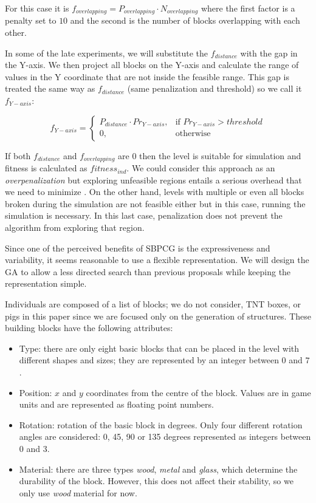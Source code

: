 \documentclass[a4paper,twoside]{article}
\begin{document}
For this case it is $f_{overlapping} = P_{overlapping} \cdot N_{overlapping}$ where the first factor is a penalty set to $10$ and the second is the number of  blocks overlapping with each other. 

In some of the late experiments, we will substitute the $f_{distance}$ with the gap in the Y-axis.  We then project all blocks on the Y-axis and calculate the range of values in the Y coordinate that are not inside the feasible range. This gap is treated the same way as $f_{distance}$
(same penalization and threshold) so we call it $f_{Y-axis}$:

$$f_{Y-axis} = 
\begin{cases}
P_{distance}\cdot Pr_{Y-axis}, & \text{if } Pr_{Y-axis} > threshold\\
0, & \text{otherwise}
\end{cases}
$$

If both $f_{distance}$ and $f_{overlapping}$ are $0$ then the level is suitable for simulation and fitness is calculated as $fitness_{ind}$. We  could consider this approach as an \textit{overpenalization} but exploring unfeasible regions entails a serious overhead that we need to minimize \cite{runarsson2003evolutionary}. On the other hand, levels with multiple or even all blocks broken during the simulation are not feasible either but in this case, running the simulation is necessary. In this last case, penalization does not prevent the algorithm from exploring that region.

Since one of the perceived benefits of SBPCG is the expressiveness and variability, it seems reasonable to use a flexible representation. We will design the GA to allow a less directed search than previous proposals while keeping the representation simple.

Individuals are composed of a list of blocks; we do not consider, TNT boxes, or pigs in this paper since we are focused only on the generation of structures. These building blocks have the following attributes:

\begin{itemize}
	\item Type: there are only eight basic blocks that can be placed in the level 
	with different shapes and sizes; they are represented by an 
        integer between $0$ and $7$.
	\item Position: $x$ and $y$  coordinates from the centre of the block. Values are in game 
	units and are represented as floating point numbers.
	\item Rotation: rotation of the basic block in degrees. Only four different 
	rotation angles are considered: 0, 45, 90 or 135 degrees represented as integers 
	between $0$ and $3$.
	\item Material: there are three types \textit{wood}, \textit{metal} and \textit{glass}, which determine the durability of the block.
	However, this does not affect their stability, so we only use \textit{wood} material for now.
\end{itemize}
\end{document}
